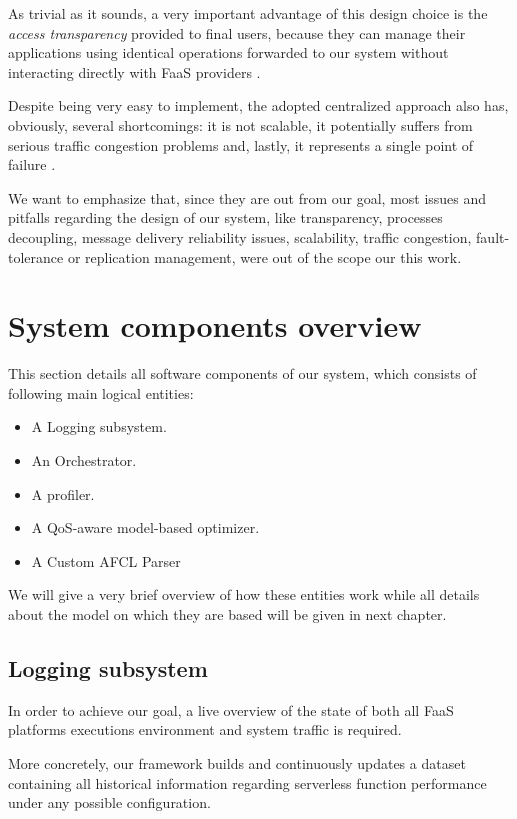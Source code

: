 \documentclass[12pt,a4paper]{report}
\begin{document}
As trivial as it sounds, a very important advantage of this design choice is the \textit{access transparency} provided to final users, because they can manage their applications using identical operations forwarded to our system without interacting directly with FaaS providers \cite{SDCC}.

Despite being very easy to implement, the adopted centralized approach also has, obviously, several shortcomings: it is not scalable, it potentially suffers from serious traffic congestion problems and, lastly, it represents a single point of failure \cite{SDCC}. 

We want to emphasize that, since they are out from our goal, most issues and pitfalls regarding the design of our system, like transparency, processes decoupling, message delivery reliability issues, scalability, traffic congestion, fault-tolerance or replication management, were out of the scope our this work.

\section{System components overview}

This section details all software components of our system, which consists of following main logical entities:

\begin{itemize}
	\item A Logging subsystem.
	\item An Orchestrator.
	\item A profiler.
	\item A QoS-aware model-based optimizer.
	\item A Custom AFCL Parser
\end{itemize}

We will give a very brief overview of how these entities work while all details about the model on which they are based will be given in next chapter.

\subsection{Logging subsystem}

In order to achieve our goal, a live overview of the state of both all FaaS platforms executions environment and system traffic is required.

More concretely, our framework builds and continuously updates a dataset containing all historical information regarding serverless function performance under any possible configuration.
\end{document}
